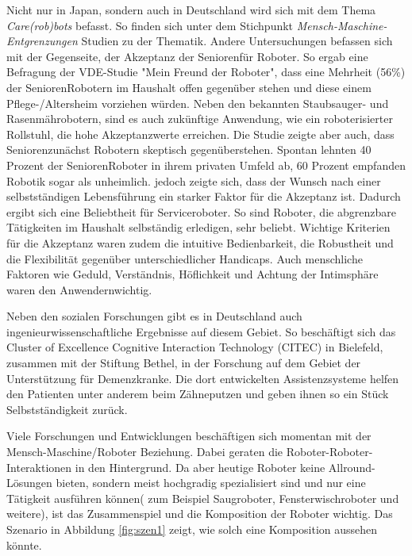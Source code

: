 Nicht nur in Japan, sondern auch in Deutschland wird sich mit dem Thema \textit{Care(rob)bots} befasst. So finden sich unter dem Stichpunkt \textit{Mensch-Maschine-Entgrenzungen} Studien zu der Thematik. Andere Untersuchungen befassen sich mit der Gegenseite, der Akzeptanz der Senioren\FemaleMale für Roboter. So ergab eine Befragung der VDE-Studie "Mein Freund der Roboter", dass eine Mehrheit (56\%) der Senioren\FemaleMale Robotern im Haushalt offen gegenüber stehen und diese einem Pflege-/Altersheim vorziehen würden. Neben den bekannten Staubsauger- und Rasenmährobotern, sind es auch zukünftige Anwendung, wie ein roboterisierter Rollstuhl, die hohe Akzeptanzwerte erreichen. Die Studie zeigte aber auch, dass Senioren\FemaleMale zunächst Robotern skeptisch gegenüberstehen. Spontan lehnten 40 Prozent der Senioren\FemaleMale Roboter in ihrem privaten Umfeld ab, 60 Prozent empfanden Robotik sogar als unheimlich. jedoch zeigte sich, dass der Wunsch nach einer selbstständigen Lebensführung ein starker Faktor für die Akzeptanz ist. Dadurch ergibt sich eine Beliebtheit für Serviceroboter. So sind Roboter, die abgrenzbare Tätigkeiten im Haushalt selbständig erledigen, sehr beliebt. Wichtige Kriterien für die Akzeptanz waren zudem die intuitive Bedienbarkeit, die Robustheit und die Flexibilität gegenüber unterschiedlicher Handicaps. Auch menschliche Faktoren wie Geduld, Verständnis, Höflichkeit und Achtung der Intimsphäre waren den Anwendern\FemaleMale wichtig.\citep{dr.sibyllemeyer2011}

Neben den sozialen Forschungen gibt es in Deutschland auch ingenieurwissenschaftliche Ergebnisse auf diesem Gebiet. So beschäftigt sich das  Cluster of Excellence Cognitive Interaction Technology (CITEC) in Bielefeld, zusammen mit der Stiftung Bethel, in der Forschung auf dem Gebiet der Unterstützung für Demenzkranke. Die dort entwickelten Assistenzsysteme helfen den Patienten unter anderem beim Zähneputzen und geben ihnen so ein Stück Selbstständigkeit zurück.

Viele Forschungen und Entwicklungen beschäftigen sich momentan mit der Mensch-Maschine/Roboter Beziehung. Dabei geraten die Roboter-Roboter-Interaktionen in den Hintergrund. Da aber heutige Roboter keine Allround-Lösungen bieten, sondern meist hochgradig spezialisiert sind und nur eine Tätigkeit ausführen können( zum Beispiel Saugroboter, Fensterwischroboter und weitere), ist das Zusammenspiel und die Komposition der Roboter wichtig. Das Szenario in Abbildung \ref{fig:szen1} zeigt, wie solch eine Komposition aussehen könnte.

